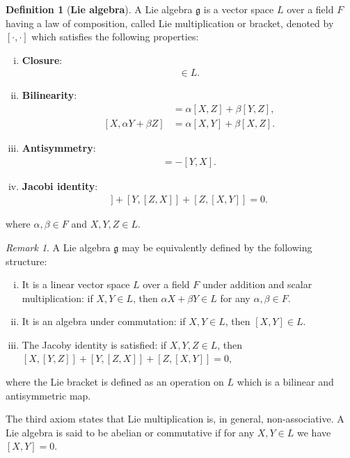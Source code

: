 \documentclass[12pt,a4paper]{report}
\theoremstyle{definition}
\newtheorem{definition}{Definition}
\theoremstyle{remark}
\newtheorem*{remark}{Remark}
\theoremstyle{remark}
\begin{document}
\begin{definition}[\textbf{Lie algebra}]
A Lie algebra $\mathfrak{g}$ is a vector space $L$ over a field $F$ having a law of composition, called Lie multiplication or bracket, denoted by $[\cdot,\cdot]$ which satisfies the following properties:
\begin{enumerate}[i.]
\item \textbf{Closure}: 
\begin{align*}
[X,Y]\in L.
\end{align*}
\item \textbf{Bilinearity}: 
\begin{align*}
[\alpha X+\beta Y,Z]&=\alpha[X,Z]+\beta[Y,Z],\\
[X,\alpha Y+\beta Z]&=\alpha[X,Y]+\beta[X,Z].
\end{align*}
\item \textbf{Antisymmetry}:
\begin{align*}
[X,Y]=-[Y,X].
\end{align*}
\item \textbf{Jacobi identity}: 
\begin{align*}
[X,[Y,Z]]+[Y,[Z,X]]+[Z,[X,Y]]=0.
\end{align*}
\end{enumerate}
where $\alpha,\beta\in F$ and $X,Y,Z\in L$.
\end{definition}
\begin{remark}A Lie algebra $\mathfrak{g}$ may be equivalently defined by the following structure:
\begin{enumerate}[i.]
\item It is a linear vector space $L$ over a field $F$ under addition and scalar multiplication: if $X,Y\in L$, then $\alpha X+\beta Y\in L$ for any $\alpha,\beta\in F$.
\item It is an algebra under commutation: if $X,Y\in L$, then $[X,Y]\in L$.
\item The Jacoby identity is satisfied: if $X,Y,Z\in L$, then $[X,[Y,Z]]+[Y,[Z,X]]+[Z,[X,Y]]=0$,
\end{enumerate}
where the Lie bracket is defined as an operation on $L$ which is a bilinear and antisymmetric map.
\end{remark}
The third axiom states that Lie multiplication is, in general, non-associative. A Lie algebra is said to be abelian or commutative if for any $X,Y\in L$ we have $[X,Y]=0$.
\end{document}
